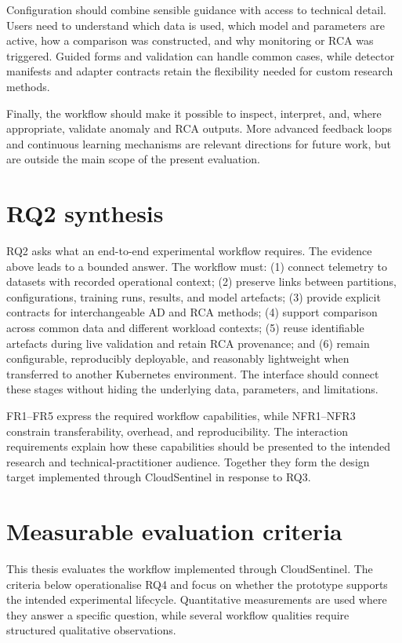 Configuration should combine sensible guidance with access to technical detail. Users need to understand which data is used, which model and parameters are active, how a comparison was constructed, and why monitoring or RCA was triggered. Guided forms and validation can handle common cases, while detector manifests and adapter contracts retain the flexibility needed for custom research methods.

Finally, the workflow should make it possible to inspect, interpret, and, where appropriate, validate anomaly and RCA outputs. More advanced feedback loops and continuous learning mechanisms are relevant directions for future work, but are outside the main scope of the present evaluation.

\section{RQ2 synthesis}

RQ2 asks what an end-to-end experimental workflow requires. The evidence above leads to a bounded answer. The workflow must: (1) connect telemetry to datasets with recorded operational context; (2) preserve links between partitions, configurations, training runs, results, and model artefacts; (3) provide explicit contracts for interchangeable AD and RCA methods; (4) support comparison across common data and different workload contexts; (5) reuse identifiable artefacts during live validation and retain RCA provenance; and (6) remain configurable, reproducibly deployable, and reasonably lightweight when transferred to another Kubernetes environment. The interface should connect these stages without hiding the underlying data, parameters, and limitations.

FR1--FR5 express the required workflow capabilities, while NFR1--NFR3 constrain transferability, overhead, and reproducibility. The interaction requirements explain how these capabilities should be presented to the intended research and technical-practitioner audience. Together they form the design target implemented through CloudSentinel in response to RQ3.

\section{Measurable evaluation criteria}
This thesis evaluates the workflow implemented through CloudSentinel. The criteria below operationalise RQ4 and focus on whether the prototype supports the intended experimental lifecycle. Quantitative measurements are used where they answer a specific question, while several workflow qualities require structured qualitative observations.


